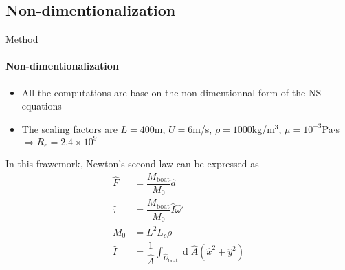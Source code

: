 \documentclass[aspectratio=169]{beamer}
\DeclareMathOperator{\newdiff}{d} %
\newcommand{\dif}{\newdiff\!}
\begin{document}

\subsection{Non-dimentionalization}
\begin{frame}{Method}
    \framesubtitle{Non-dimentionalization}
    
    \begin{itemize}
        \item All the computations are base on the non-dimentionnal form of the NS equations 
        \item The scaling factors are $L = 400$m, $U=6$m/s, $\rho = 1000$kg/m$^3$, $\mu=10^{-3}$Pa$\cdot$s $\Longrightarrow R_e = 2.4\times 10^9$
    \end{itemize}

    \vfill
    In this frawemork, Newton's second law can be expressed as 
    \begin{align*}
        \hat{F} &= \dfrac{M_\text{boat}}{M_0} \hat{a} \\
        \hat{\tau} &= \dfrac{M_\text{boat}}{M_0} \hat{I} \hat{\omega}' \\
        M_0 &= L^2 L_c \rho \\
        \hat{I} &= \dfrac{1}{\hat{A}} \int_{\hat{\Omega}_\text{boat}} \dif \hat{A} (\hat{x}^2 + \hat{y}^2)
    \end{align*}



\end{frame}

\end{document}
